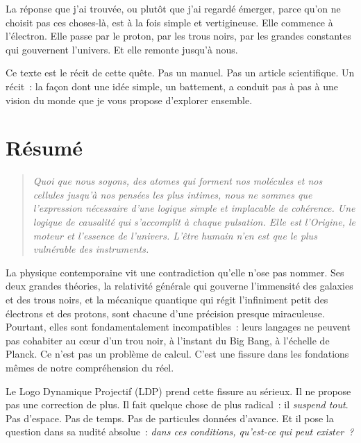 \documentclass[12pt, a4paper, openright]{book}
\begin{document}
\medskip

La réponse que j'ai trouvée, ou plutôt que j'ai regardé émerger, parce qu'on ne choisit pas ces choses-là, est à la fois simple et vertigineuse. Elle commence à l'électron. Elle passe par le proton, par les trous noirs, par les grandes constantes qui gouvernent l'univers. Et elle remonte jusqu'à nous.

\medskip

Ce texte est le récit de cette quête. Pas un manuel. Pas un article scientifique. Un récit~: la façon dont une idée simple, un battement, a conduit pas à pas à une vision du monde que je vous propose d'explorer ensemble.

\chapter*{Résumé}

\begin{quote}
\textit{Quoi que nous soyons, des atomes qui forment nos molécules et nos cellules jusqu'à nos pensées les plus intimes, nous ne sommes que l'expression nécessaire d'une logique simple et implacable de cohérence. Une logique de causalité qui s'accomplit à chaque pulsation. Elle est l'Origine, le moteur et l'essence de l'univers. L'être humain n'en est que le plus vulnérable des instruments.}
\end{quote}

\bigskip

La physique contemporaine vit une contradiction qu'elle n'ose pas nommer. Ses deux grandes théories, la relativité générale qui gouverne l'immensité des galaxies et des trous noirs, et la mécanique quantique qui régit l'infiniment petit des électrons et des protons, sont chacune d'une précision presque miraculeuse. Pourtant, elles sont fondamentalement incompatibles~: leurs langages ne peuvent pas cohabiter au c\oe{}ur d'un trou noir, à l'instant du Big Bang, à l'échelle de Planck. Ce n'est pas un problème de calcul. C'est une fissure dans les fondations mêmes de notre compréhension du réel.

\medskip

Le Logo Dynamique Projectif (LDP) prend cette fissure au sérieux. Il ne propose pas une correction de plus. Il fait quelque chose de plus radical~: il \emph{suspend tout}. Pas d'espace. Pas de temps. Pas de particules données d'avance. Et il pose la question dans sa nudité absolue~: \emph{dans ces conditions, qu'est-ce qui peut exister~?}
\end{document}
